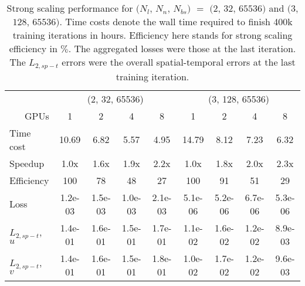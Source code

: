\begin{table}[hbt!]
\centering
\singlespacing
\caption[
    PINNs, 2D TGV, $Re=100$: strong scaling performance for $(N_l$, $N_n$, $N_{bs})$ $=$ $(2$, $32$, $65536)$ and $(3$, $128$, $65536)$
]{
    Strong scaling performance for $(N_l$, $N_n$, $N_{bs})$ $=$ $(2$, $32$, $65536)$ and $(3$, $128$, $65536)$.%
    Time costs denote the wall time required to finish 400k training iterations in hours.%
    Efficiency here stands for strong scaling efficiency in $\%$.%
    The aggregated losses were those at the last iteration.%
    The $L_{2,sp-t}$ errors were the overall spatial-temporal errors at the last training iteration.%
}
\label{table:strong-scaling-perf}
\begin{tabular}{lcccccccc}
\toprule
 & \multicolumn{4}{c}{(2, 32, 65536)} & \multicolumn{4}{c}{(3, 128, 65536)} \\
\cmidrule(rl){2-5} \cmidrule(rl){6-9}
\multicolumn{1}{r}{GPUs} & 1 & 2 & 4 & 8 & 1 & 2 & 4 & 8 \\
\midrule
Time cost & 10.69 &  6.82 &  5.57 &  4.95 & 14.79 &  8.12 &  7.23 &  6.32 \\
\addlinespace
Speedup & 1.0x & 1.6x & 1.9x & 2.2x & 1.0x & 1.8x & 2.0x & 2.3x \\
\addlinespace
Efficiency & 100 & 78 & 48 & 27 & 100 & 91 & 51 & 29 \\
\addlinespace
Loss & 1.2e-03 & 1.5e-03 & 1.0e-03 & 2.1e-03 & 5.1e-06 & 5.2e-06 & 6.7e-06 & 5.3e-06 \\
\addlinespace
$L_{2,sp-t}$, $u$ & 1.4e-01 & 1.6e-01 & 1.5e-01 & 1.7e-01 & 1.1e-02 & 1.6e-02 & 1.2e-02 & 8.9e-03 \\
\addlinespace
$L_{2,sp-t}$, $v$ & 1.4e-01 & 1.6e-01 & 1.5e-01 & 1.8e-01 & 1.0e-02 & 1.7e-02 & 1.2e-02 & 9.6e-03 \\
\bottomrule
\end{tabular}
\end{table}
